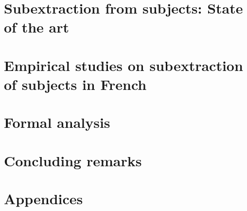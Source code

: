 \documentclass[output=book]{langscibook}
\begin{document}
\maketitle
\frontmatter
{} %
{\sloppy\tableofcontents}
  
  
%  
\mainmatter


\part{Subextraction from subjects: State of the art}
\label{part:1}


\part{Empirical studies on subextraction of subjects in French}
\label{part:2}


\part{Formal analysis}
\label{part:3}


\part{Concluding remarks}
\label{part:4}


\appendix
\part{Appendices}




\end{document}
